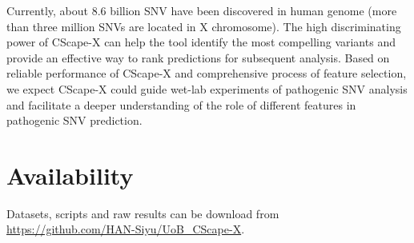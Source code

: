 \documentclass[a4paper,nohyper,nobib,openany,justified]{tufte-book}
\begin{document}
\begin{fullwidth}
Currently, about 8.6 billion SNV have been discovered in human genome (more than three million SNVs are located in X chromosome). The high discriminating power of CScape-X can help the tool identify the most compelling variants and provide an effective way to rank predictions for subsequent analysis. Based on reliable performance of CScape-X and comprehensive process of feature selection, we expect CScape-X could guide wet-lab experiments of pathogenic SNV analysis and facilitate a deeper understanding of the role of different features in pathogenic SNV prediction.

\clearpage
\chapter{Availability}

Datasets, scripts and raw results can be download from
\url{https://github.com/HAN-Siyu/UoB_CScape-X}.
\backmatter

\printbibliography
\end{fullwidth}
\printindex
\end{document}
